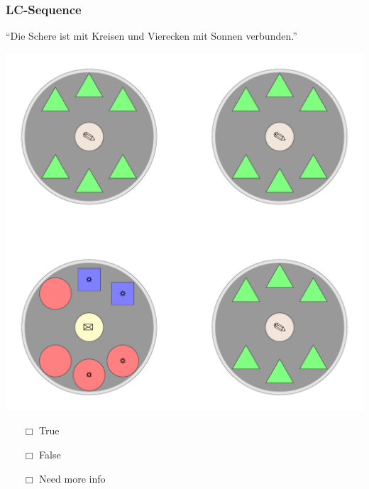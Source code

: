 \documentclass[fleqn,10pt,serif,xcolor=dvipsnames]{beamer}
\newcommand{\LC}{LC\xspace}
\newcommand{\mymark}[1]{{\color{blue}{#1}}}
\begin{document}
\begin{frame}
  \frametitle{\LC-Sequence}
  \begin{center}
    ``Die Schere ist mit Kreisen und Vierecken mit Sonnen verbunden.''

    \vspace{0.1cm}

    \includegraphics[width=0.5 \textwidth]{../../pictures/lc_01_1.pdf}

    \vspace{0.1cm}

    \begin{multicols}{3}
      \begin{itemize} 
      \item[$\Box$] True\\
        \onslide<2>{$\leadsto$  \mymark{false}}
      \item[$\Box$] False\\
        \onslide<2>{$\leadsto$ \mymark{false}}
      \item[$\Box$] Need more info 
      \end{itemize}
    \end{multicols}

  \end{center}
\end{frame}
\end{document}
